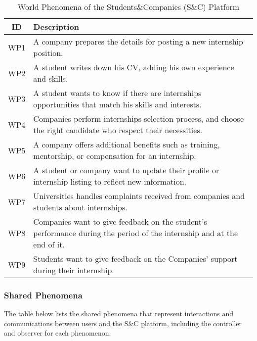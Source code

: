 \begin{table}[h!]
\renewcommand{\arraystretch}{1.5}
\centering
\begin{tabular}{|c|p{12cm}|}
\hline
\textbf{ID} & \textbf{Description} \\
\hline
WP1 & A company prepares the details for posting a new internship position.\\
\hline
WP2 & A student writes down his CV, adding his own experience and skills.\\
\hline
WP3 & A student wants to know if there are  internships opportunities that match his skills and interests. \\ 
\hline
WP4 & Companies perform internships selection process, and choose the right candidate who respect their necessities.\\
\hline
WP5 & A company offers additional benefits such as training, mentorship, or compensation for an internship. \\ 
\hline
WP6 & A student or company want to update their profile or internship listing to reflect new information. \\ 
\hline
WP7 & Universities handles complaints received from companies and students about internships. \\
\hline
WP8 & Companies want to give feedback on the student's performance during the period of the internship and at the end of it.\\
\hline
WP9 & Students want to give feedback on the Companies' support during their internship.\\
\hline
\end{tabular}
\caption{World Phenomena of the Students\&Companies (S\&C) Platform}
\end{table}

\subsubsection{Shared Phenomena}

The table below lists the shared phenomena that represent interactions and communications between users and the S\&C platform, including the controller and observer for each phenomenon.

